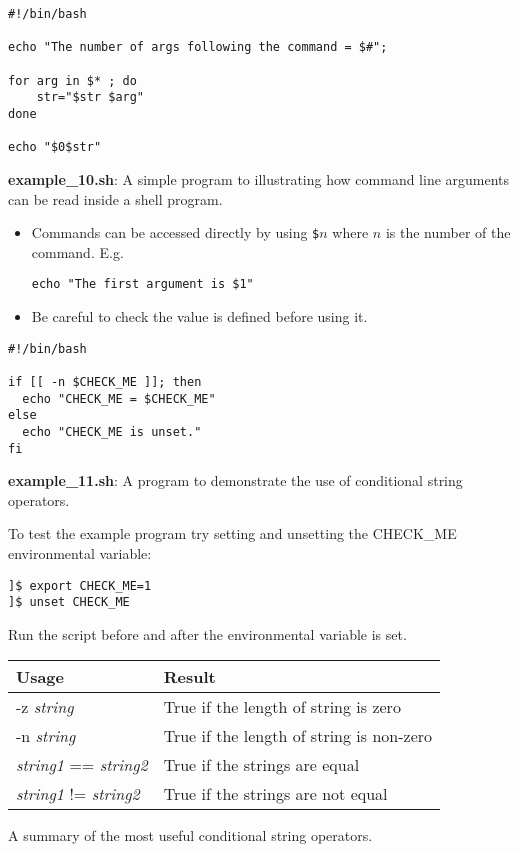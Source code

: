 \documentclass[17pt,dvips]{foils}
\begin{document}

\begin{verbatim}
#!/bin/bash

echo "The number of args following the command = $#";

for arg in $* ; do
    str="$str $arg"
done

echo "$0$str"
\end{verbatim}
{\bf example\_10.sh}: A simple program to illustrating how command line
arguments can be read inside a shell program.

\begin{itemize}
\item Commands can be accessed directly by using \texttt{\$}$n$ where
$n$ is the number of the command. E.g.
\begin{verbatim}
echo "The first argument is $1"
\end{verbatim}
\item Be careful to check the value is defined before using it.
\end{itemize} 



\begin{verbatim}
#!/bin/bash
 
if [[ -n $CHECK_ME ]]; then
  echo "CHECK_ME = $CHECK_ME"
else
  echo "CHECK_ME is unset."
fi
\end{verbatim}
{\bf example\_11.sh}: A program to demonstrate the use of
conditional string operators.

\noindent To test the example program try setting and unsetting the CHECK\_ME
environmental variable:
\begin{verbatim}
]$ export CHECK_ME=1
]$ unset CHECK_ME
\end{verbatim}
Run the script before and after the environmental variable is set.

\begin{center}

\begin{tabular}{|l|l|} \hline \hline
Usage & Result \\ \hline \hline
-z {\em string} & True if the length of string is zero \\ \hline
-n {\em string} & True if the length of string is non-zero \\ \hline
{\em string1} == {\em string2} & True if the strings are equal \\ \hline
{\em string1} != {\em string2} & True if the strings are not equal \\ \hline \hline
\end{tabular}

\noindent A summary of the most useful conditional string operators.
\end{center}
\end{document}
